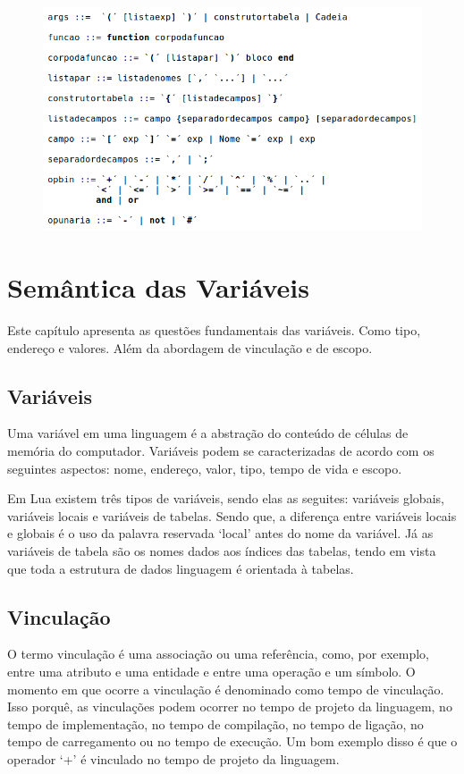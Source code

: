 \documentclass[
12pt, %
openright, %
oneside, %
a4paper, %
english, %
brazil, %
]{abntex2}
\begin{document}
\begin{figure}[H]
\centering
\includegraphics[width=0.9\linewidth]{imagens/sintaxe2.png}
\end{figure}


\chapter{Semântica das Variáveis}
Este capítulo apresenta as questões fundamentais das variáveis. Como tipo, endereço e valores. Além da abordagem de vinculação e de escopo.

\section{Variáveis}
Uma variável em uma linguagem é a abstração do conteúdo de células de memória do computador. Variáveis podem se caracterizadas de acordo com os seguintes aspectos: nome, endereço, valor, tipo, tempo de vida e escopo.

Em Lua existem três tipos de variáveis, sendo elas as seguites: variáveis globais, variáveis locais e variáveis de tabelas. Sendo que, a diferença entre variáveis locais e globais é o uso da palavra reservada `local' antes do nome da variável. Já as variáveis de tabela são os nomes dados aos índices das tabelas, tendo em vista que toda a estrutura de dados linguagem é orientada à tabelas.

\section{Vinculação}
O termo vinculação é uma associação ou uma referência, como, por exemplo, entre uma atributo e uma entidade e entre uma operação e um símbolo. O momento em que ocorre a vinculação é denominado como tempo de vinculação. Isso porquê, as vinculações podem ocorrer no tempo de projeto da linguagem, no tempo de implementação, no tempo de compilação, no tempo de ligação, no tempo de carregamento ou no tempo de execução. Um bom exemplo disso é que o operador `+' é vinculado no tempo de projeto da linguagem.
\end{document}
